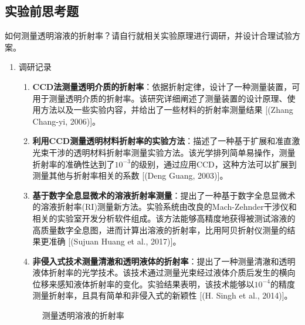 \documentclass[dvipsnames, svgnames,a4paper,11pt]{article}
\begin{document}
	
	
	
	\subsection{实验前思考题}
	
	\begin{question}
		如何测量透明溶液的折射率？请自行就相关实验原理进行调研，并设计合理试验方案。
	\end{question}
	\begin{enumerate}
		\item 调研记录
		\begin{enumerate}
			\item \textbf{CCD法测量透明介质的折射率}：依据折射定律，设计了一种测量装置，可用于测量透明介质的折射率。该研究详细阐述了测量装置的设计原理、使用方法以及一些实验内容，并给出了一些材料的折射率测量结果 [(Zhang Chang-yi, 2006)]。
			
			\item \textbf{利用CCD测量透明材料折射率的实验方法}：描述了一种基于扩展和准直激光束干涉的透明材料折射率测量实验方法。该光学排列简单易操作，测量折射率的准确性达到了$10^{-3}$的级别，通过应用CCD，这种方法可以扩展到测量其他与折射率相关的系数 [(Deng Guang, 2003)]。
			
			\item \textbf{基于数字全息显微术的溶液折射率测量}：提出了一种基于数字全息显微术的溶液折射率(RI)测量新方法。实验系统由改良的Mach-Zehnder干涉仪和相关的实验室开发分析软件组成。该方法能够高精度地获得被测试溶液的高质量数字全息图，进而计算出溶液的折射率，比用阿贝折射仪测量的结果更准确 [(Sujuan Huang et al., 2017)]。
			
			\item \textbf{非侵入式技术测量清澈和透明液体的折射率}：提出了一种测量清澈和透明液体折射率的光学技术。该技术通过测量光束经过液体介质后发生的横向位移来感知液体折射率的变化。实验结果表明，该技术能够以$10^{-4}$的精度测量折射率，且具有简单和非侵入式的新颖性 [(H. Singh et al., 2014)]。
			
		\end{enumerate}
		
		\begin{figure}[htbp]
			\centering
			\caption{测量透明溶液的折射率}
			\label{fig:fig2}			
		\end{figure}
		

\end{enumerate}
\end{document}
